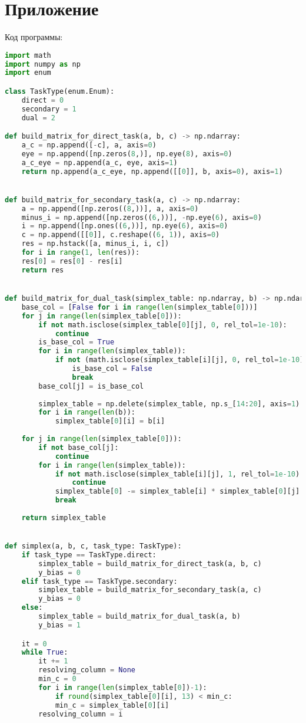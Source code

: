 \documentclass[a4paper, 14pt]{extarticle}
\begin{document}
	\section{Приложение}  
	Код программы:		
 	\begin{lstlisting}[language=python]
import math
import numpy as np
import enum

class TaskType(enum.Enum):
	direct = 0
	secondary = 1
	dual = 2

def build_matrix_for_direct_task(a, b, c) -> np.ndarray:
	a_c = np.append([-c], a, axis=0)
	eye = np.append([np.zeros(8,)], np.eye(8), axis=0)
	a_c_eye = np.append(a_c, eye, axis=1)
	return np.append(a_c_eye, np.append([[0]], b, axis=0), axis=1)


def build_matrix_for_secondary_task(a, c) -> np.ndarray:
	a = np.append([np.zeros((8,))], a, axis=0)
	minus_i = np.append([np.zeros((6,))], -np.eye(6), axis=0)
	i = np.append([np.ones((6,))], np.eye(6), axis=0)
	c = np.append([[0]], c.reshape((6, 1)), axis=0)
	res = np.hstack([a, minus_i, i, c])
	for i in range(1, len(res)):
	res[0] = res[0] - res[i]
	return res


def build_matrix_for_dual_task(simplex_table: np.ndarray, b) -> np.ndarray:
	base_col = [False for i in range(len(simplex_table[0]))]
	for j in range(len(simplex_table[0])):
		if not math.isclose(simplex_table[0][j], 0, rel_tol=1e-10):
			continue
		is_base_col = True
		for i in range(len(simplex_table)):
			if not (math.isclose(simplex_table[i][j], 0, rel_tol=1e-10) or math.isclose(simplex_table[i][j], 1, rel_tol=1e-10)):
				is_base_col = False
				break
		base_col[j] = is_base_col
	
		simplex_table = np.delete(simplex_table, np.s_[14:20], axis=1)
		for i in range(len(b)):
			simplex_table[0][i] = b[i]
	
	for j in range(len(simplex_table[0])):
		if not base_col[j]:
			continue
		for i in range(len(simplex_table)):
			if not math.isclose(simplex_table[i][j], 1, rel_tol=1e-10):
				continue
			simplex_table[0] -= simplex_table[i] * simplex_table[0][j]
			break
	
	return simplex_table


def simplex(a, b, c, task_type: TaskType):
	if task_type == TaskType.direct:
		simplex_table = build_matrix_for_direct_task(a, b, c)
		y_bias = 0
	elif task_type == TaskType.secondary:
		simplex_table = build_matrix_for_secondary_task(a, c)
		y_bias = 0
	else:
		simplex_table = build_matrix_for_dual_task(a, b)
		y_bias = 1

	it = 0
	while True:
		it += 1
		resolving_column = None
		min_c = 0
		for i in range(len(simplex_table[0])-1):
			if round(simplex_table[0][i], 13) < min_c:
			min_c = simplex_table[0][i]
		resolving_column = i


\end{lstlisting}
\end{document}
